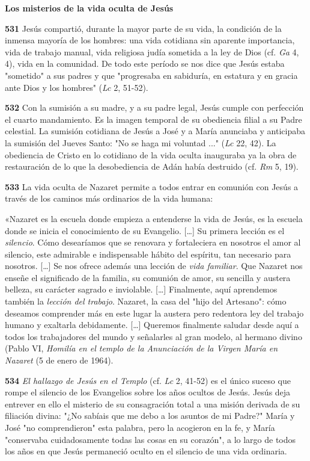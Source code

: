 \documentclass[]{article}
\begin{document}
\textbf{Los misterios de la vida oculta de Jesús}

\textbf{531} Jesús compartió, durante la mayor parte de su vida, la
condición de la inmensa mayoría de los hombres: una vida cotidiana sin
aparente importancia, vida de trabajo manual, vida religiosa judía
sometida a la ley de Dios (cf. \emph{Ga} 4, 4), vida en la comunidad. De
todo este período se nos dice que Jesús estaba "sometido" a sus padres y
que "progresaba en sabiduría, en estatura y en gracia ante Dios y los
hombres" (\emph{Lc} 2, 51-52).

\textbf{532} Con la sumisión a su madre, y a su padre legal, Jesús
cumple con perfección el cuarto mandamiento. Es la imagen temporal de su
obediencia filial a su Padre celestial. La sumisión cotidiana de Jesús a
José y a María anunciaba y anticipaba la sumisión del Jueves Santo: "No
se haga mi voluntad ..." (\emph{Lc} 22, 42). La obediencia de Cristo en
lo cotidiano de la vida oculta inauguraba ya la obra de restauración de
lo que la desobediencia de Adán había destruido (cf. \emph{Rm} 5, 19).

\textbf{533} La vida oculta de Nazaret permite a todos entrar en
comunión con Jesús a través de los caminos más ordinarios de la vida
humana:

«Nazaret es la escuela donde empieza a entenderse la vida de Jesús, es
la escuela donde se inicia el conocimiento de su Evangelio. [\ldots{}] Su
primera lección es el \emph{silencio}. Cómo desearíamos que se renovara
y fortaleciera en nosotros el amor al silencio, este admirable e
indispensable hábito del espíritu, tan necesario para nosotros.
[\ldots{}] Se nos ofrece además una lección de \emph{vida familiar}. Que
Nazaret nos enseñe el significado de la familia, su comunión de amor, su
sencilla y austera belleza, su carácter sagrado e inviolable. [\ldots{}]
Finalmente, aquí aprendemos también la \emph{lección del trabajo}.
Nazaret, la casa del "hijo del Artesano": cómo deseamos comprender más
en este lugar la austera pero redentora ley del trabajo humano y
exaltarla debidamente. [\ldots{}] Queremos finalmente saludar desde aquí
a todos los trabajadores del mundo y señalarles al gran modelo, al
hermano divino (Pablo VI, \emph{Homilía en el templo de la Anunciación
de la Virgen María en Nazaret} (5 de enero de 1964).

\textbf{534} \emph{El hallazgo de Jesús en el Templo} (cf. \emph{Lc} 2,
41-52) es el único suceso que rompe el silencio de los Evangelios sobre
los años ocultos de Jesús. Jesús deja entrever en ello el misterio de su
consagración total a una misión derivada de su filiación divina: "¿No
sabíais que me debo a los asuntos de mi Padre?" María y José "no
comprendieron" esta palabra, pero la acogieron en la fe, y María
"conservaba cuidadosamente todas las cosas en su corazón", a lo largo de
todos los años en que Jesús permaneció oculto en el silencio de una vida
ordinaria.
\end{document}
